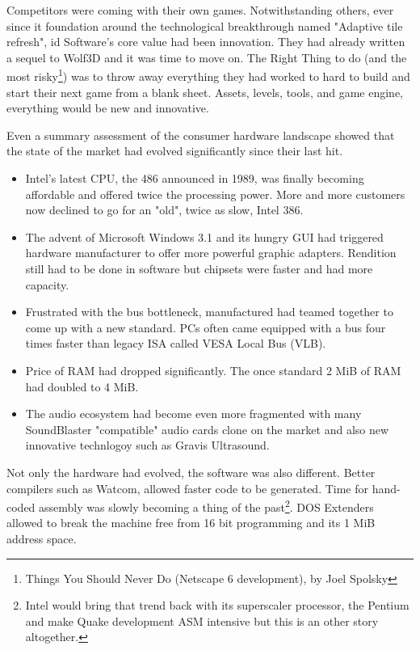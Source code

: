 Competitors were coming with their own games. Notwithstanding others, ever since it foundation around the technological breakthrough named "Adaptive tile refresh", id Software's core value had been innovation. They had already written a sequel to Wolf3D and it was time to move on. The Right Thing to do (and the most risky\footnote{Things You Should Never Do (Netscape 6 development), by Joel Spolsky}) was to throw away everything they had worked to hard to build and start their next game from a blank sheet. Assets, levels, tools, and game engine, everything would be new and innovative.\\
\par
Even a summary assessment of the consumer hardware landscape showed that the state of the market had evolved significantly since their last hit.\\
\begin{itemize}
\item Intel's latest CPU, the 486 announced in 1989, was finally becoming affordable and offered twice the processing power. More and more customers now declined to go for an "old", twice as slow, Intel 386. 
\item The advent of Microsoft Windows 3.1 and its hungry GUI had triggered hardware manufacturer to offer more powerful graphic adapters. Rendition still had to be done in software but chipsets were faster and had more capacity.
\item Frustrated with the bus bottleneck, manufactured had teamed together to come up with a new standard. PCs often came equipped with a bus four times faster than legacy ISA called VESA Local Bus (VLB). 
\item Price of RAM had dropped significantly. The once standard 2 MiB of RAM had doubled to 4 MiB. 
\item The audio ecosystem had become even more fragmented with many SoundBlaster "compatible" audio cards clone on the market and also new innovative technlogoy such as Gravis Ultrasound.\\
\end{itemize}
 \par 
 Not only the hardware had evolved, the software was also different. Better compilers such as Watcom, allowed faster code to be generated. Time for hand-coded assembly was slowly becoming a thing of the past\footnote{Intel would bring that trend back with its superscaler processor, the Pentium and make Quake development ASM intensive but this is an other story altogether.}. DOS Extenders allowed to break the machine free from 16 bit programming and its 1 MiB address space.\\
